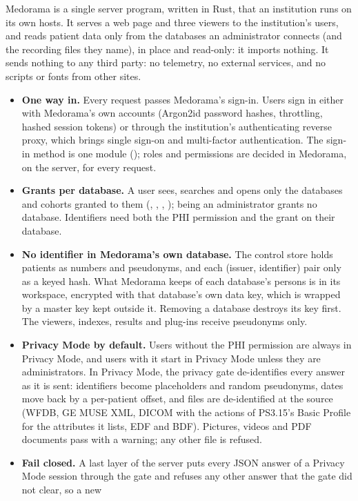 Medorama is a single server program, written in Rust, that an institution runs on its own hosts.
It serves a web page and three viewers to the institution's users, and reads patient data only
from the databases an administrator connects (and the recording files they name), in place and
read-only: it imports nothing. It sends nothing to any third party: no
telemetry, no external services, and no scripts or fonts from other sites.
\begin{itemize}
\item \textbf{One way in.} Every request passes Medorama's sign-in. Users sign in either with
  Medorama's own accounts (Argon2id password hashes, throttling, hashed session tokens) or
  through the institution's authenticating reverse proxy, which brings single sign-on and
  multi-factor authentication. The sign-in method is one module (); roles and
  permissions are decided in Medorama, on the server, for every request.
\item \textbf{Grants per database.} A user sees, searches and opens only the databases and
  cohorts granted to them (, , , ); being an
  administrator grants no database. Identifiers need both the PHI permission and the 
  grant on their database.
\item \textbf{No identifier in Medorama's own database.} The control store holds patients as
  numbers and pseudonyms, and each (issuer, identifier) pair only as a keyed hash. What Medorama
  keeps of each database's persons is in its workspace, encrypted with that database's own data
  key, which is wrapped by a master key kept outside it. Removing a database destroys its key
  first. The viewers, indexes, results and plug-ins receive pseudonyms only.
\item \textbf{Privacy Mode by default.} Users without the PHI permission are always in Privacy
  Mode, and users with it start in Privacy Mode unless they are administrators. In Privacy Mode,
  the privacy gate de-identifies every answer as it is sent: identifiers become placeholders and
  random pseudonyms, dates move back by a per-patient offset, and files are de-identified at the
  source (WFDB, GE MUSE XML, DICOM with the actions of PS3.15's Basic Profile for the
  attributes it lists, EDF and BDF). Pictures,
  videos and PDF documents pass with a warning; any other file is refused.
\item \textbf{Fail closed.} A last layer of the server puts every JSON answer of a Privacy Mode
  session through the gate and refuses any other answer that the gate did not clear, so a new

\end{itemize}
